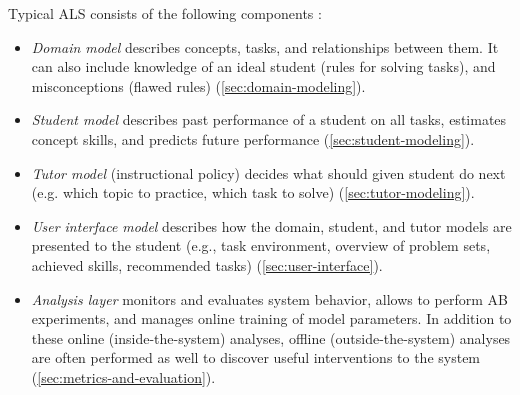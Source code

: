 \smallskip
Typical ALS consists of the following components
\cite{its-learner-models}:
\begin{itemize}
\item \emph{Domain model}
  describes concepts, tasks, and relationships between them.
  It can also include knowledge of an ideal student (rules for solving tasks),
  and misconceptions (flawed rules)
  (\cref{sec:domain-modeling}).
\item \emph{Student model} %
  describes past performance of a student on all tasks,
  estimates concept skills,
  and predicts future performance
  (\cref{sec:student-modeling}).
\item \emph{Tutor model}
  (instructional policy)
  decides what should given student do next
  (e.g. which topic to practice, which task to solve)
  (\cref{sec:tutor-modeling}).
\item \emph{User interface model} %
  describes how the domain, student, and tutor models are presented to
  the student (e.g., task environment, overview of problem sets, achieved
  skills, recommended tasks)
  (\cref{sec:user-interface}).
\item \emph{Analysis layer}
  monitors and evaluates system behavior,
  allows to perform AB experiments,
  and manages online training of model parameters.
  In addition to these online (inside-the-system) analyses,
  offline (outside-the-system) analyses are often performed as well
  to discover useful interventions to the system  %
  (\cref{sec:metrics-and-evaluation}).
\end{itemize}



